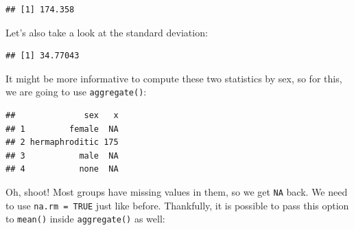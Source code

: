 \documentclass[
]{article}
\newenvironment{Shaded}{\begin{snugshade}}{\end{snugshade}}
\newcommand{\AttributeTok}[1]{\textcolor[rgb]{0.77,0.63,0.00}{#1}}
\newcommand{\ConstantTok}[1]{\textcolor[rgb]{0.00,0.00,0.00}{#1}}
\newcommand{\FunctionTok}[1]{\textcolor[rgb]{0.00,0.00,0.00}{#1}}
\newcommand{\NormalTok}[1]{#1}
\newcommand{\SpecialCharTok}[1]{\textcolor[rgb]{0.00,0.00,0.00}{#1}}
\begin{document}
\begin{verbatim}
## [1] 174.358
\end{verbatim}

Let's also take a look at the standard deviation:

\begin{Shaded}
\end{Shaded}

\begin{verbatim}
## [1] 34.77043
\end{verbatim}

It might be more informative to compute these two statistics by sex, so for this, we are going
to use \texttt{aggregate()}:

\begin{Shaded}
\end{Shaded}

\begin{verbatim}
##              sex   x
## 1         female  NA
## 2 hermaphroditic 175
## 3           male  NA
## 4           none  NA
\end{verbatim}

Oh, shoot! Most groups have missing values in them, so we get \texttt{NA} back. We need to use \texttt{na.rm\ =\ TRUE}
just like before. Thankfully, it is possible to pass this option to \texttt{mean()} inside \texttt{aggregate()} as well:

\begin{Shaded}
\end{Shaded}
\end{document}
